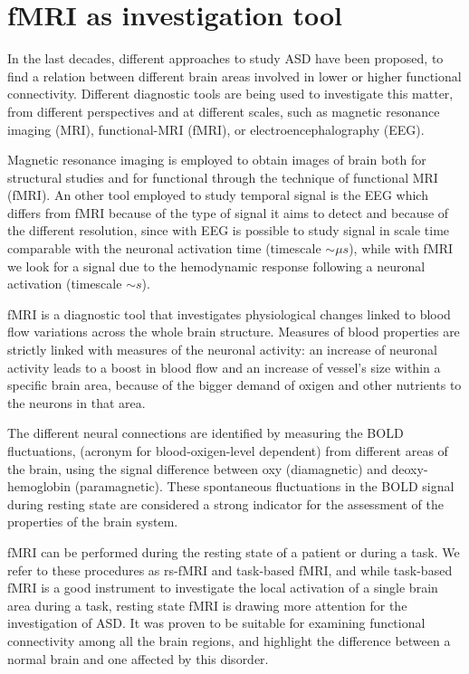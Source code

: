 \documentclass[11pt]{report}
\begin{document}
\section{fMRI as investigation tool}

In the last decades, different approaches to study ASD have been proposed, to find a relation between different brain areas involved in lower or higher functional connectivity.
Different diagnostic tools are being used to investigate this matter, from different perspectives and at different scales, such as magnetic resonance imaging (MRI), functional-MRI (fMRI), or electroencephalography (EEG).

Magnetic resonance imaging is employed to obtain images of brain both for structural studies and for functional through the  technique of functional MRI (fMRI).
An other tool employed to study temporal signal is the EEG which differs from fMRI because of the type of signal it aims to detect and because of the different resolution, since with EEG is possible to study signal in scale time comparable with the neuronal activation time (timescale $\sim \mu s$), while with fMRI we look for a signal due to the hemodynamic response following a neuronal activation (timescale $\sim s$).


fMRI is a diagnostic tool that investigates physiological changes linked to blood flow variations across the whole brain structure.
Measures of blood properties are strictly linked with measures of the neuronal activity: an increase of neuronal activity leads to a boost in blood flow and an increase of vessel's size within a specific brain area, because of the bigger demand of oxigen and other nutrients to the neurons in that area.

The different neural connections are identified by measuring the BOLD fluctuations, (acronym for blood-oxigen-level dependent) from different areas of the brain, using the signal difference between oxy (diamagnetic) and deoxy-hemoglobin (paramagnetic).
These spontaneous fluctuations in the BOLD signal during resting state are considered a strong indicator for the assessment of the properties of the brain system.

fMRI can be performed during the resting state of a patient or during a task.
We refer to these procedures as rs-fMRI and task-based fMRI, and while task-based fMRI is a good instrument to investigate the local activation of a single brain area during a task, resting state fMRI is drawing more attention for the investigation of ASD.
It was proven to be suitable for examining functional connectivity among all the brain regions, and highlight the difference between a normal brain and one affected by this disorder.
\end{document}
